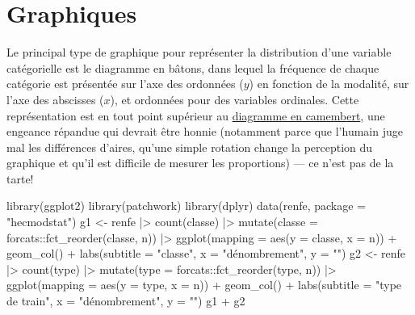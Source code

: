 \documentclass[
  11pt,
  letterpaper,
]{scrbook}
\newenvironment{Shaded}{\begin{snugshade}}{\end{snugshade}}
\newcommand{\AttributeTok}[1]{\textcolor[rgb]{0.40,0.45,0.13}{#1}}
\newcommand{\FunctionTok}[1]{\textcolor[rgb]{0.28,0.35,0.67}{#1}}
\newcommand{\NormalTok}[1]{\textcolor[rgb]{0.00,0.23,0.31}{#1}}
\newcommand{\OtherTok}[1]{\textcolor[rgb]{0.00,0.23,0.31}{#1}}
\newcommand{\SpecialCharTok}[1]{\textcolor[rgb]{0.37,0.37,0.37}{#1}}
\newcommand{\StringTok}[1]{\textcolor[rgb]{0.13,0.47,0.30}{#1}}
\theoremstyle{definition}
\theoremstyle{remark}
\begin{document}
\hypertarget{graphiques}{%
\section{Graphiques}\label{graphiques}}

Le principal type de graphique pour représenter la distribution d'une
variable catégorielle est le diagramme en bâtons, dans lequel la
fréquence de chaque catégorie est présentée sur l'axe des ordonnées
(\(y\)) en fonction de la modalité, sur l'axe des abscisses (\(x\)), et
ordonnées pour des variables ordinales. Cette représentation est en tout
point supérieur au
\href{http://www.perceptualedge.com/articles/08-21-07.pdf}{diagramme en
camembert}, une engeance répandue qui devrait être honnie (notamment
parce que l'humain juge mal les différences d'aires, qu'une simple
rotation change la perception du graphique et qu'il est difficile de
mesurer les proportions) --- ce n'est pas de la tarte!

\begin{Shaded}
\begin{Highlighting}[]
\FunctionTok{library}\NormalTok{(ggplot2)}
\FunctionTok{library}\NormalTok{(patchwork)}
\FunctionTok{library}\NormalTok{(dplyr)}
\FunctionTok{data}\NormalTok{(renfe, }\AttributeTok{package =} \StringTok{"hecmodstat"}\NormalTok{)}
\NormalTok{g1 }\OtherTok{\textless{}{-}}\NormalTok{ renfe }\SpecialCharTok{|\textgreater{}}
    \FunctionTok{count}\NormalTok{(classe) }\SpecialCharTok{|\textgreater{}}
    \FunctionTok{mutate}\NormalTok{(}\AttributeTok{classe =}\NormalTok{ forcats}\SpecialCharTok{::}\FunctionTok{fct\_reorder}\NormalTok{(classe, n))  }\SpecialCharTok{|\textgreater{}}
\FunctionTok{ggplot}\NormalTok{(}\AttributeTok{mapping =} \FunctionTok{aes}\NormalTok{(}\AttributeTok{y =}\NormalTok{ classe, }\AttributeTok{x =}\NormalTok{ n)) }\SpecialCharTok{+} 
    \FunctionTok{geom\_col}\NormalTok{() }\SpecialCharTok{+} 
    \FunctionTok{labs}\NormalTok{(}\AttributeTok{subtitle =} \StringTok{"classe"}\NormalTok{, }
    \AttributeTok{x =} \StringTok{"dénombrement"}\NormalTok{, }
    \AttributeTok{y =} \StringTok{""}\NormalTok{)}
\NormalTok{g2 }\OtherTok{\textless{}{-}}\NormalTok{ renfe }\SpecialCharTok{|\textgreater{}}
    \FunctionTok{count}\NormalTok{(type) }\SpecialCharTok{|\textgreater{}}
    \FunctionTok{mutate}\NormalTok{(}\AttributeTok{type =}\NormalTok{ forcats}\SpecialCharTok{::}\FunctionTok{fct\_reorder}\NormalTok{(type, n))  }\SpecialCharTok{|\textgreater{}}
\FunctionTok{ggplot}\NormalTok{(}\AttributeTok{mapping =} \FunctionTok{aes}\NormalTok{(}\AttributeTok{y =}\NormalTok{ type, }\AttributeTok{x =}\NormalTok{ n)) }\SpecialCharTok{+} 
    \FunctionTok{geom\_col}\NormalTok{() }\SpecialCharTok{+} 
    \FunctionTok{labs}\NormalTok{(}\AttributeTok{subtitle =} \StringTok{"type de train"}\NormalTok{, }
         \AttributeTok{x =} \StringTok{"dénombrement"}\NormalTok{, }
         \AttributeTok{y =} \StringTok{""}\NormalTok{)}
\NormalTok{g1 }\SpecialCharTok{+}\NormalTok{ g2}
\end{Highlighting}
\end{Shaded}
\end{document}
